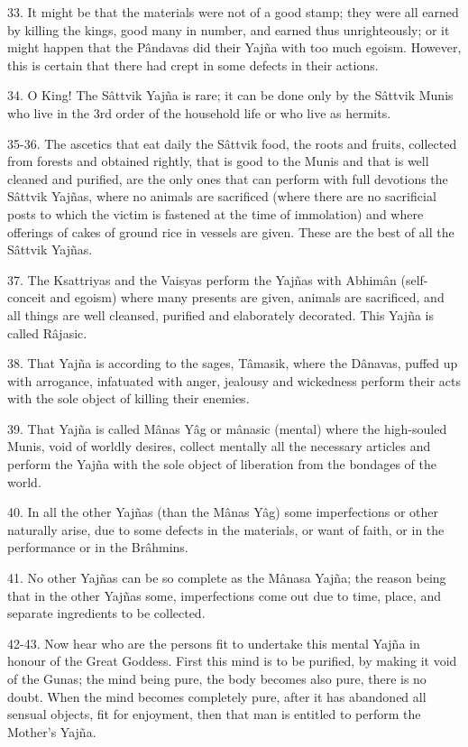 33. It might be that the materials were not of a good stamp; they were all earned by killing the kings, good many in number, and earned thus unrighteously; or it might happen that the P\^andavas did their Yaj\~na with too much egoism. However, this is certain that there had crept in some defects in their actions.

34. O King! The S\^attvik Yaj\~na is rare; it can be done only by the S\^attvik Munis who live in the 3rd order of the household life or who live as hermits.

35-36. The ascetics that eat daily the S\^attvik food, the roots and fruits, collected from forests and obtained rightly, that is good to the Munis and that is well cleaned and purified, are the only ones that can perform with full devotions the S\^attvik Yaj\~nas, where no animals are sacrificed (where there are no sacrificial posts to which the victim is fastened at the time of immolation) and where offerings of cakes of ground rice in vessels are given. These are the best of all the S\^attvik Yaj\~nas.

37. The Ksattriyas and the Vaisyas perform the Yaj\~nas with Abhim\^an (self-conceit and egoism) where many presents are given, animals are sacrificed, and all things are well cleansed, purified and elaborately decorated. This Yaj\~na is called R\^ajasic.

38. That Yaj\~na is according to the sages, T\^amasik, where the D\^anavas, puffed up with arrogance, infatuated with anger, jealousy and wickedness perform their acts with the sole object of killing their enemies.

39. That Yaj\~na is called M\^anas Y\^ag or m\^anasic (mental) where the high-souled Munis, void of worldly desires, collect mentally all the necessary articles and perform the Yaj\~na with the sole object of liberation from the bondages of the world.

40. In all the other Yaj\~nas (than the M\^anas Y\^ag) some imperfections or other naturally arise, due to some defects in the materials, or want of faith, or in the performance or in the Br\^ahmins.

41. No other Yaj\~nas can be so complete as the M\^anasa Yaj\~na; the reason being that in the other Yaj\~nas some, imperfections come out due to time, place, and separate ingredients to be collected.

42-43. Now hear who are the persons fit to undertake this mental Yaj\~na in honour of the Great Goddess. First this mind is to be purified, by making it void of the Gunas; the mind being pure, the body becomes also pure, there is no doubt. When the mind becomes completely pure, after it has abandoned all sensual objects, fit for enjoyment, then that man is entitled to perform the Mother's Yaj\~na.

